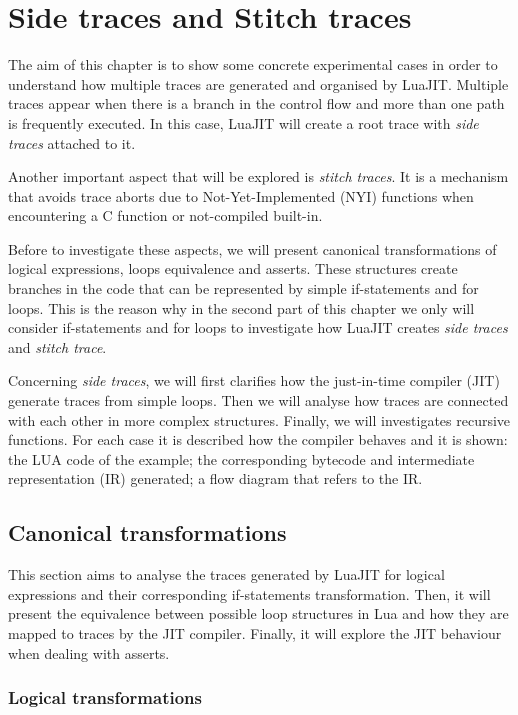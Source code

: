 \chapter{Side traces and Stitch traces}
\label{chapter:side-stitch-traces}

The aim of this chapter is to show some concrete experimental cases in order to understand how multiple traces are generated and organised by LuaJIT. Multiple traces appear when there is a branch in the control flow and more than one path is frequently executed. In this case, LuaJIT will create a root trace with \textit{side traces}\textit{} attached to it.

Another important aspect that will be explored is \textit{stitch traces}. It is a mechanism that avoids trace aborts due to Not-Yet-Implemented (NYI) functions when encountering a C function or  not-compiled built-in.

Before to investigate these aspects, we will present canonical transformations of logical expressions, loops equivalence and asserts. These structures create branches in the code that can be represented by simple if-statements and for loops. This is the reason why in the second part of this chapter we only will consider if-statements and for loops to investigate how LuaJIT creates \textit{side traces} and \textit{stitch trace}.

Concerning \textit{side traces}, we will first clarifies how the just-in-time compiler (JIT) generate traces from simple loops. Then we will analyse how traces are connected with each other in more complex structures. Finally, we will investigates recursive functions. For each case it is described how the compiler behaves and it is shown: the LUA code of the example; the corresponding bytecode and intermediate representation (IR) generated; a flow diagram that refers to the IR.

\section{Canonical transformations}
This section aims to analyse the traces generated by LuaJIT for logical expressions and their corresponding if-statements transformation. Then, it will present the equivalence between possible loop structures in Lua and how they are mapped to traces by the JIT compiler. Finally, it will explore the JIT behaviour when dealing with asserts.

\subsection{Logical transformations}
